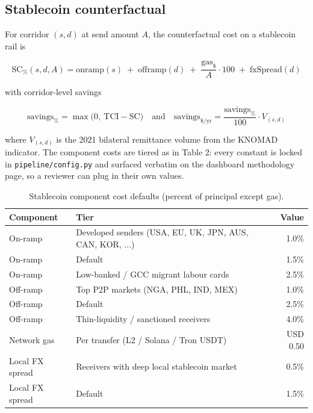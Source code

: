 \documentclass[
  11pt,
]{article}
\begin{document}
\subsection{Stablecoin counterfactual}\label{stablecoin-counterfactual}

For corridor \((s, d)\) at send amount \(A\), the counterfactual cost on
a stablecoin rail is

\begin{equation}
\text{SC}_\%(s, d, A) = \mathrm{onramp}(s) \;+\; \mathrm{offramp}(d) \;+\; \frac{\mathrm{gas}_{\$}}{A}\cdot 100 \;+\; \mathrm{fxSpread}(d)
\label{eq:sc}
\end{equation}

with corridor-level savings

\begin{equation}
\mathrm{savings}_\% = \max\bigl(0,\ \text{TCI} - \text{SC}\bigr) \quad\text{and}\quad \mathrm{savings}_{\$/\text{yr}} = \frac{\mathrm{savings}_\%}{100} \cdot V_{(s,d)}
\label{eq:savings}
\end{equation}

where \(V_{(s,d)}\) is the 2021 bilateral remittance volume from the
KNOMAD indicator. The component costs are tiered as in Table 2: every
constant is locked in \texttt{pipeline/config.py} and surfaced verbatim
on the dashboard methodology page, so a reviewer can plug in their own
values.

\begin{table}[h]
\centering
\caption{Stablecoin component cost defaults (percent of principal except gas).}
\begin{tabular}{llr}
\toprule
\textbf{Component} & \textbf{Tier} & \textbf{Value} \\
\midrule
On-ramp & Developed senders (USA, EU, UK, JPN, AUS, CAN, KOR, ...) & 1.0\% \\
On-ramp & Default & 1.5\% \\
On-ramp & Low-banked / GCC migrant labour cards & 2.5\% \\
\midrule
Off-ramp & Top P2P markets (NGA, PHL, IND, MEX) & 1.0\% \\
Off-ramp & Default & 2.5\% \\
Off-ramp & Thin-liquidity / sanctioned receivers & 4.0\% \\
\midrule
Network gas & Per transfer (L2 / Solana / Tron USDT) & USD 0.50 \\
\midrule
Local FX spread & Receivers with deep local stablecoin market & 0.5\% \\
Local FX spread & Default & 1.5\% \\
\bottomrule
\end{tabular}
\end{table}
\end{document}
